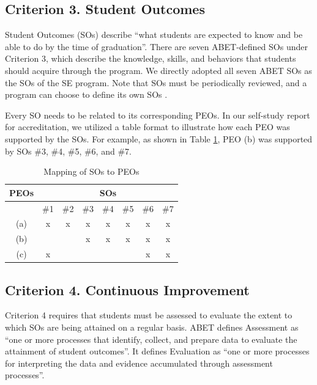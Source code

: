 \documentclass{article}
\begin{document}
\subsection{Criterion 3. Student Outcomes} \label{3.3}
Student Outcomes (SOs) describe ``what students are expected to know and be able to do by the time of graduation''. There are seven ABET-defined SOs under Criterion 3, which describe the knowledge, skills, and behaviors that students should acquire through the program.  We directly adopted all seven ABET SOs as the SOs of the SE program.  Note that SOs must be periodically reviewed, and a program can choose to define its own SOs \cite{fu14}. 

Every SO needs to be related to its corresponding PEOs.  In our self-study report for accreditation, we utilized a table format to illustrate how each PEO was supported by the SOs.  For example, as shown in Table \ref{so_peo}, PEO (b) was supported by SOs \#3, \#4, \#5, \#6, and \#7.

\begin{table}[ht]
\caption{Mapping of SOs to PEOs} 
\label{so_peo} 
\centering %
\begin{tabular}{c c c c c c c c} %
\hline\hline %
PEOs  &  \multicolumn{7}{c}{SOs}\\
\hline %
& \#1 & \#2 & \#3 & \#4 & \#5 & \#6 & \#7 \\ [0.5ex] %

(a) & x & x & x & x & x & x & x \\ 
(b) &   &   & x & x & x & x & x \\
(c) & x &   &   &   &   & x & x \\ %
\hline %
\end{tabular}
\end{table}

\subsection{Criterion 4. Continuous Improvement}
Criterion 4 requires that students must be assessed to evaluate the extent to which SOs are being attained on a regular basis.  ABET defines Assessment as ``one or more processes that identify, collect, and prepare data to evaluate the attainment of student outcomes''.  It defines Evaluation as ``one or more processes for interpreting the data and evidence accumulated through assessment processes''.
\end{document}

